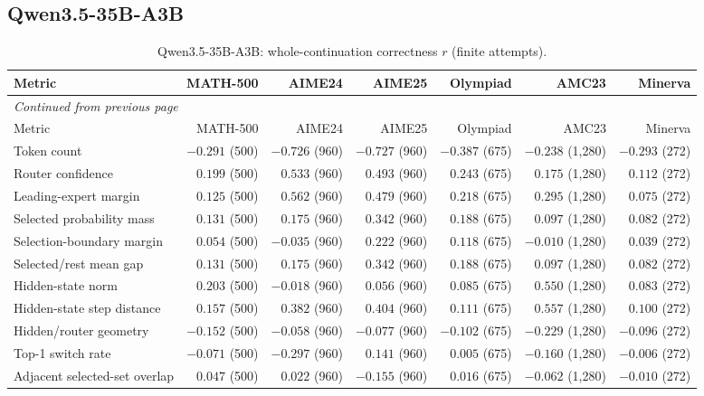 \subsection{Qwen3.5-35B-A3B}
\begingroup\scriptsize\setlength{\tabcolsep}{4pt}
\begin{longtable}{@{}lrrrrrr@{}}
\caption{Qwen3.5-35B-A3B: whole-continuation correctness $r$ (finite attempts).}\label{tab:multi-summary-qwen}\\
\toprule
Metric & MATH-500 & AIME24 & AIME25 & Olympiad & AMC23 & Minerva \\
\midrule\endfirsthead
\multicolumn{7}{l}{\textit{Continued from previous page}}\\
\toprule
Metric & MATH-500 & AIME24 & AIME25 & Olympiad & AMC23 & Minerva \\
\midrule\endhead
\bottomrule\endfoot
Token count & $-0.291$ (500) & $-0.726$ (960) & $-0.727$ (960) & $-0.387$ (675) & $-0.238$ (1,280) & $-0.293$ (272) \\
Router confidence & $0.199$ (500) & $0.533$ (960) & $0.493$ (960) & $0.243$ (675) & $0.175$ (1,280) & $0.112$ (272) \\
Leading-expert margin & $0.125$ (500) & $0.562$ (960) & $0.479$ (960) & $0.218$ (675) & $0.295$ (1,280) & $0.075$ (272) \\
Selected probability mass & $0.131$ (500) & $0.175$ (960) & $0.342$ (960) & $0.188$ (675) & $0.097$ (1,280) & $0.082$ (272) \\
Selection-boundary margin & $0.054$ (500) & $-0.035$ (960) & $0.222$ (960) & $0.118$ (675) & $-0.010$ (1,280) & $0.039$ (272) \\
Selected/rest mean gap & $0.131$ (500) & $0.175$ (960) & $0.342$ (960) & $0.188$ (675) & $0.097$ (1,280) & $0.082$ (272) \\
Hidden-state norm & $0.203$ (500) & $-0.018$ (960) & $0.056$ (960) & $0.085$ (675) & $0.550$ (1,280) & $0.083$ (272) \\
Hidden-state step distance & $0.157$ (500) & $0.382$ (960) & $0.404$ (960) & $0.111$ (675) & $0.557$ (1,280) & $0.100$ (272) \\
Hidden/router geometry & $-0.152$ (500) & $-0.058$ (960) & $-0.077$ (960) & $-0.102$ (675) & $-0.229$ (1,280) & $-0.096$ (272) \\
Top-1 switch rate & $-0.071$ (500) & $-0.297$ (960) & $0.141$ (960) & $0.005$ (675) & $-0.160$ (1,280) & $-0.006$ (272) \\
Adjacent selected-set overlap & $0.047$ (500) & $0.022$ (960) & $-0.155$ (960) & $0.016$ (675) & $-0.062$ (1,280) & $-0.010$ (272) \\
\end{longtable}\endgroup

